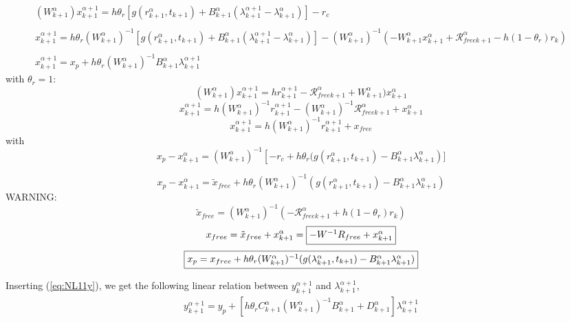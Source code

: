 \begin{equation}
   \begin{array}{l}
    (W^{\alpha}_{k+1})x^{\alpha+1}_{k+1} = h \theta _r \left[ g(r^{\alpha}_{k+1},t_{k+1}) +
    B^{\alpha}_{k+1} (\lambda^{\alpha+1}_{k+1} - \lambda^{\alpha}_{k+1}) \right] -r_c \\ \\
    x^{\alpha+1}_{k+1} = h \theta _r (W^{\alpha}_{k+1})^{-1}\left[ g(r^{\alpha}_{k+1},t_{k+1}) + B^{\alpha}_{k+1} (\lambda^{\alpha+1}_{k+1} - \lambda^{\alpha}_{k+1}) \right] -(W^{\alpha}_{k+1})^{-1}(- W^{\alpha}_{k+1} x^{\alpha}_{k+1} + \mathcal R_{free k+1} ^{\alpha} - h(1-\theta_r)r_k) \\ \\
    x^{\alpha+1}_{k+1} =  x_p + h \theta _r (W^{\alpha}_{k+1})^{-1}  B^{\alpha}_{k+1}
    \lambda^{\alpha+1}_{k+1} 

   \end{array}
\end{equation}
with $\theta _r =1$:
\[(W^{\alpha}_{k+1})x^{\alpha+1}_{k+1}= hr^{\alpha+1}_{k+1}- \mathcal R_{free k+1} ^{\alpha}+W^{\alpha}_{k+1})x^{\alpha}_{k+1}\]
\[x^{\alpha+1}_{k+1}= h(W^{\alpha}_{k+1})^{-1}r^{\alpha+1}_{k+1}- (W^{\alpha}_{k+1})^{-1} \mathcal R_{free k+1} ^{\alpha}+x^{\alpha}_{k+1}\]
\[x^{\alpha+1}_{k+1}= h(W^{\alpha}_{k+1})^{-1}r^{\alpha+1}_{k+1}+x_{free}\]
with
\begin{equation}
x_p - x^{\alpha}_{k+1} =  (W^{\alpha}_{k+1})^{-1}  \left[ -r_c + h \theta _r( g(r^{\alpha}_{k+1},t_{k+1}) -
      B^{\alpha}_{k+1} \lambda^{\alpha}_{k+1} \right)]
  \end{equation}

\[ x_p - x^{\alpha}_{k+1} = \tilde x_{free} + h \theta _r(W^{\alpha}_{k+1})^{-1}( g(r^{\alpha}_{k+1},t_{k+1}) -
      B^{\alpha}_{k+1} \lambda^{\alpha}_{k+1} ) \]
      WARNING:
\[    \tilde x_{free}= (W^{\alpha}_{k+1})^{-1}(-
      \mathcal R _{free k+1} ^{\alpha} +h(1-\theta _r)r_k)\]
      \[x_{free} = \tilde x_{free} + x^{\alpha}_{k+1}=\fbox{$-W^{-1}R_{free} + x^{\alpha}_{k+1}$}\]
\[ \fbox{$x_p  = x_{free} + h \theta _r(W^{\alpha}_{k+1})^{-1}( g(\lambda ^{\alpha}_{k+1},t_{k+1}) -
      B^{\alpha}_{k+1} \lambda^{\alpha}_{k+1} )$} \]

    
Inserting (\ref{eq:NL11y}), we get the following linear relation between $y^{\alpha+1}_{k+1}$ and $\lambda^{\alpha+1}_{k+1}$, 
\begin{equation}
   \begin{array}{l}
 y^{\alpha+1}_{k+1} = y_p + \left[ h \theta _r C^{\alpha}_{k+1} (W^{\alpha}_{k+1})^{-1}  B^{\alpha}_{k+1} + D^{\alpha}_{k+1} \right]\lambda^{\alpha+1}_{k+1}
   \end{array}
\end{equation}


